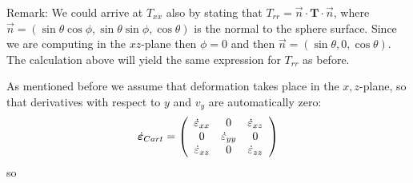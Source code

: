 \documentclass[a4paper,12pt]{article}
\begin{document}
Remark: We could arrive at $T_{xx}$ also by stating that $T_{rr} = \vec{n} \cdot {\bm T} \cdot \vec{n}$,
where $\vec{n}=(\sin\theta \cos\phi, \sin\theta\sin\phi,\cos\theta)$ is the normal to the sphere surface.
Since we are computing in the $xz$-plane then $\phi=0$ and then 
$\vec{n}=(\sin\theta , 0 ,\cos\theta)$. The calculation above will yield the 
same expression for $T_{rr}$ as before.





\newpage
As mentioned before we assume that deformation takes place in the $x,z$-plane, so that 
derivatives with respect to $y$ and $v_y$ are automatically zero:
\[
\dot{\bm\varepsilon}_{\tiny Cart}
=
\left(
\begin{array}{ccc}
\dot\varepsilon_{xx} & 0 & \dot{\varepsilon}_{xz} \\
0 & \dot{\varepsilon}_{yy}  & 0 \\
\dot{\varepsilon}_{xz} & 0 & \dot\varepsilon_{zz}
\end{array}
\right)
\]
so 
\end{document}
